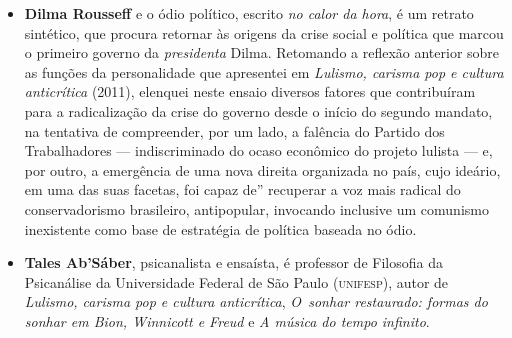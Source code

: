 \begin{itemize}

\item \textbf{Dilma Rousseff} e o ódio político, escrito \emph{no calor da hora}, é um
  retrato sintético, que procura retornar às origens da crise social e política
  que marcou o primeiro governo da \emph{presidenta} Dilma.  Retomando a
  reflexão anterior sobre as funções da personalidade que apresentei em
  \emph{Lulismo, carisma pop e cultura anticrítica} (2011), elenquei neste ensaio
  diversos fatores que contribuíram para a radicalização da crise do governo
  desde o início do segundo mandato, na tentativa de compreender, por um lado,
  a falência do Partido dos Trabalhadores — indiscriminado do ocaso econômico
  do projeto lulista — e, por outro, a emergência de uma nova direita
  organizada no país, cujo ideário, em uma das suas facetas, foi capaz de''
  recuperar a voz mais radical do conservadorismo brasileiro, antipopular,
  invocando inclusive um comunismo inexistente como base de estratégia de política baseada no ódio.  

\item \textbf{Tales Ab’Sáber}, psicanalista e ensaísta, é professor de Filosofia da Psicanálise da Universidade Federal 
de São Paulo (\textsc{unifesp}), autor de 
\emph{Lulismo, carisma pop e cultura anticrítica},
\textit{O~sonhar
restaurado: formas do sonhar em Bion, Winnicott e Freud} e
\textit{A música do tempo infinito}. 

\end{itemize}

